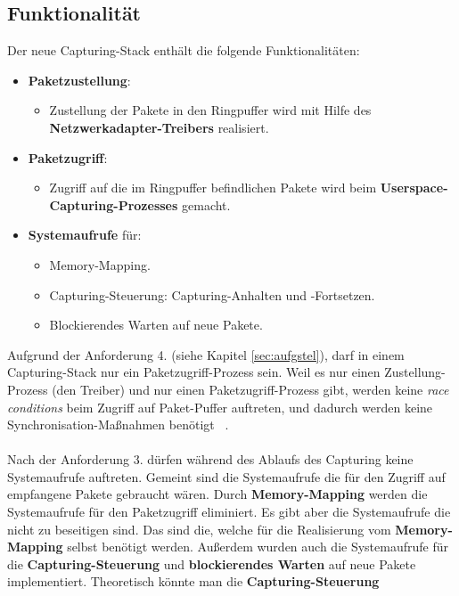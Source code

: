 \newpage
\subsection{Funktionalität}
Der neue Capturing-Stack enthält die folgende Funktionalitäten:
\begin{itemize}
	\item \textbf{Paketzustellung}:
		\begin{itemize}
			\item Zustellung der Pakete in den Ringpuffer wird mit Hilfe des
				\textbf{Netzwerkadapter-Treibers} realisiert. 
		\end{itemize}
	\item \textbf{Paketzugriff}:
		\begin{itemize}
			\item  Zugriff auf die im Ringpuffer befindlichen Pakete  wird beim
				\textbf{Userspace-Capturing-Prozesses} gemacht.
		\end{itemize}
	\item \textbf{Systemaufrufe} für:
		\begin{itemize}
			\item Memory-Mapping.
			\item Capturing-Steuerung:  Capturing-Anhalten und -Fortsetzen.
			\item Blockierendes Warten auf neue Pakete.
		\end{itemize}
	\end{itemize}
Aufgrund der Anforderung 4. (siehe Kapitel \ref{sec:aufgstel}), darf
in einem Capturing-Stack nur ein Paketzugriff-Prozess sein. Weil es  nur einen
Zustellung-Prozess (den Treiber) und nur einen Paketzugriff-Prozess gibt,
werden keine \emph{race conditions} beim Zugriff auf Paket-Puffer auftreten,
und dadurch werden keine Synchronisation-Maßnahmen benötigt ~\cite{ldd_book_circle_buffer}.\\\\
%
Nach der Anforderung 3. dürfen während des Ablaufs des Capturing keine
Systemaufrufe auftreten. Gemeint sind die Systemaufrufe die für den Zugriff auf
empfangene Pakete gebraucht wären. Durch \textbf{Memory-Mapping} werden die
Systemaufrufe für den Paketzugriff eliminiert. Es gibt aber die Systemaufrufe
die nicht zu beseitigen sind. Das sind die, welche für die Realisierung vom
\textbf{Memory-Mapping} selbst benötigt werden.  Außerdem wurden auch die Systemaufrufe
für die \textbf{Capturing-Steuerung} und \textbf{blockierendes Warten} auf neue
Pakete implementiert. Theoretisch könnte man die \textbf{Capturing-Steuerung}
